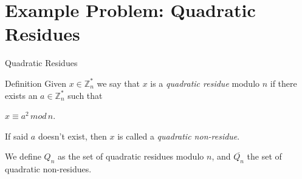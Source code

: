 \documentclass{beamer}
\begin{document}
\section{Example Problem: Quadratic Residues}

\begin{frame}{Quadratic Residues}
\begin{block}{Definition}
	Given $x\in \mathbb{Z}^*_n$ we say that $x$ is a \textit{quadratic residue}
	modulo $n$ if there exists an $a \in \mathbb{Z}^*_n$ such that
	
	$x \equiv a^2 \, mod \, n$.
	
	If said $a$ doesn't exist, then $x$ is called a \textit{quadratic non-residue}.
\end{block}

We define $Q_n$ as the set of quadratic residues modulo $n$, and $\overline{Q_n}$ the set of quadratic non-residues.
\end{frame}



%
%		
%		
%



\end{document}

